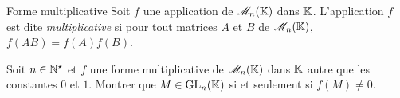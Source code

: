 \begin{defi}{Forme multiplicative}
    Soit $f$ une application de $\mathscr{M}_n(\mathbb{K})$ dans $\mathbb{K}$. L'application $f$ est dite \emph{multiplicative} si pour tout matrices $A$ et $B$ de $\mathscr{M}_n(\mathbb{K})$, $f(AB) = f(A)f(B)$.
\end{defi}

\begin{exercice}
    Soit $n \in \mathbb{N}^\star$ et $f$ une forme multiplicative de $\mathscr{M}_n(\mathbb{K})$ dans $\mathbb{K}$ autre que les constantes $0$ et $1$. Montrer que $M \in \mathrm{GL}_n(\mathbb{K})$ si et seulement si $f(M) \not= 0$. 
\end{exercice}